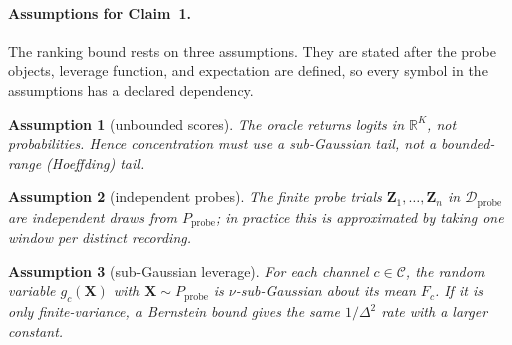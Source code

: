 \documentclass[11pt]{article}
\newtheorem{assumption}{Assumption}
\begin{document}
\paragraph{Assumptions for Claim~1.}
The ranking bound rests on three assumptions. They are stated after the probe objects,
leverage function, and expectation are defined, so every symbol in the assumptions has a
declared dependency.
\begin{assumption}[unbounded scores]\label{as:logits}
The oracle returns logits in $\mathbb{R}^K$, not probabilities. Hence concentration
must use a sub-Gaussian tail, not a bounded-range (Hoeffding) tail.
\end{assumption}
\begin{assumption}[independent probes]\label{as:indep}
The finite probe trials $\mathbf{Z}_1,\ldots,\mathbf{Z}_n$ in
$\mathcal{D}_{\mathrm{probe}}$ are independent draws from $P_{\mathrm{probe}}$; in
practice this is approximated by taking one window per distinct recording.
\end{assumption}
\begin{assumption}[sub-Gaussian leverage]\label{as:subg}
For each channel $c\in\mathcal{C}$, the random variable $g_c(\mathbf{X})$ with
$\mathbf{X}\sim P_{\mathrm{probe}}$ is $\nu$-sub-Gaussian about its mean $F_c$. If it is
only finite-variance, a Bernstein bound gives the same $1/\Delta^2$ rate with a larger
constant.
\end{assumption}
\end{document}

